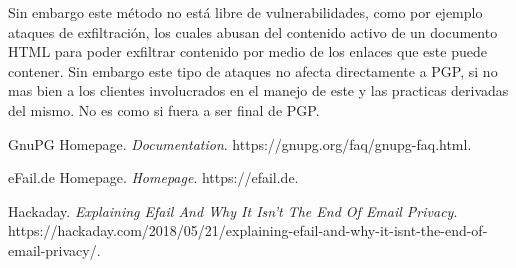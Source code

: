 \documentclass[11pt]{utalcaDoc}
\begin{document}
Sin embargo este método no está libre de vulnerabilidades, como por ejemplo ataques de exfiltración, los cuales abusan del contenido activo de un documento HTML para poder exfiltrar contenido por medio de los enlaces que este puede contener\cite{REF:efail}. Sin embargo este tipo de ataques no afecta directamente a PGP, si no mas bien a los clientes involucrados en el manejo de este y las practicas derivadas del mismo. No es como si fuera a ser final de PGP\cite{REF:hackaday}.


\begin{thebibliography}{9}
	GnuPG Homepage.
	\textit{Documentation}.
	https://gnupg.org/faq/gnupg-faq.html.


	eFail.de Homepage.
	\textit{Homepage}.
	https://efail.de.


	Hackaday.
	\textit{Explaining Efail And Why It Isn’t The End Of Email Privacy}.
	https://hackaday.com/2018/05/21/explaining-efail-and-why-it-isnt-the-end-of-email-privacy/.
\end{thebibliography}
\end{document}
